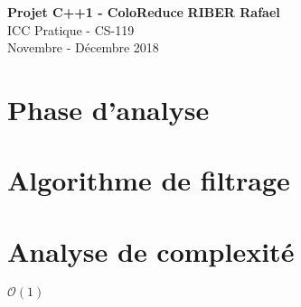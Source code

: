 \documentclass[a4paper, 11pt]{article}
\begin{document}
\noindent
\large\textbf{Projet C++1 - ColoReduce} \hfill \textbf{RIBER Rafael} \\
\normalsize ICC Pratique - CS-119\\
\hfill Novembre - Décembre 2018

\section*{Phase d'analyse}

\section*{Algorithme de filtrage}


\section*{Analyse de complexité}
$\mathcal{O}(1)$
\end{document}
